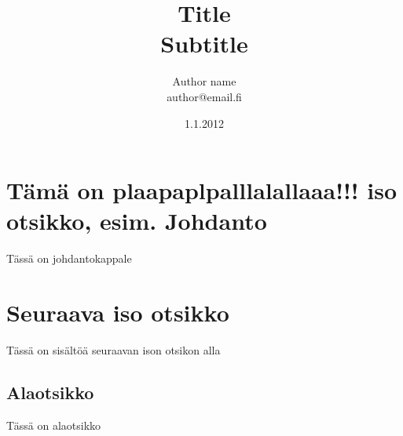 \documentclass[a4paper]{article}
\begin{document}
\title{\huge Title \\ \large Subtitle}
\date{1.1.2012}
\author{Author name \\ author@email.fi}
\maketitle

\large

\section{Tämä on plaapaplpalllalallaaa!!! iso otsikko, esim. Johdanto}

Tässä on johdantokappale

\section{Seuraava iso otsikko}

Tässä on sisältöä seuraavan ison otsikon alla

\subsection{Alaotsikko}

Tässä on alaotsikko

\citep{janne2012}




\end{document}
